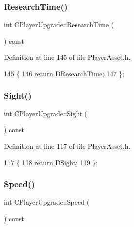 \subsubsection{\texorpdfstring{Research\+Time()}{ResearchTime()}}
{\footnotesize\ttfamily int C\+Player\+Upgrade\+::\+Research\+Time (\begin{DoxyParamCaption}{ }\end{DoxyParamCaption}) const\hspace{0.3cm}{\ttfamily [inline]}}



Definition at line 145 of file Player\+Asset.\+h.


\begin{DoxyCode}
145                                 \{
146             \textcolor{keywordflow}{return} \hyperlink{classCPlayerUpgrade_ae233bf472f72c8f16a6f1b1ea3b78012}{DResearchTime};  
147         \};
\end{DoxyCode}
\hypertarget{classCPlayerUpgrade_a893161e7735491cf1aa437ea5b23bd02}{}\label{classCPlayerUpgrade_a893161e7735491cf1aa437ea5b23bd02} 
\subsubsection{\texorpdfstring{Sight()}{Sight()}}
{\footnotesize\ttfamily int C\+Player\+Upgrade\+::\+Sight (\begin{DoxyParamCaption}{ }\end{DoxyParamCaption}) const\hspace{0.3cm}{\ttfamily [inline]}}



Definition at line 117 of file Player\+Asset.\+h.


\begin{DoxyCode}
117                          \{
118             \textcolor{keywordflow}{return} \hyperlink{classCPlayerUpgrade_ad07eacdeddddd94cf9766dc04d380b55}{DSight};  
119         \};
\end{DoxyCode}
\hypertarget{classCPlayerUpgrade_a9a282b069dc742c7f0ed46a6b4770370}{}\label{classCPlayerUpgrade_a9a282b069dc742c7f0ed46a6b4770370} 
\subsubsection{\texorpdfstring{Speed()}{Speed()}}
{\footnotesize\ttfamily int C\+Player\+Upgrade\+::\+Speed (\begin{DoxyParamCaption}{ }\end{DoxyParamCaption}) const\hspace{0.3cm}{\ttfamily [inline]}}




